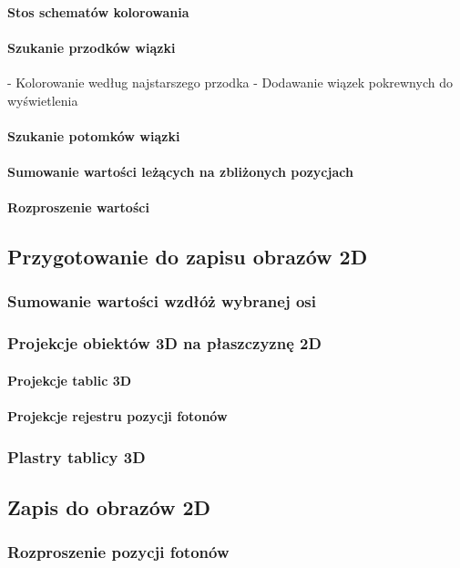 \paragraph{Stos schematów kolorowania}
\paragraph{Szukanie przodków wiązki}
- Kolorowanie według najstarszego przodka
- Dodawanie wiązek pokrewnych do wyświetlenia 
\paragraph{Szukanie potomków wiązki}
\paragraph{Sumowanie wartości leżących na zbliżonych pozycjach}
\paragraph{Rozproszenie wartości}

\subsection{Przygotowanie do zapisu obrazów 2D}
\subsubsection{Sumowanie wartości wzdłóż wybranej osi}
\subsubsection{Projekcje obiektów 3D na płaszczyznę 2D}
\paragraph{Projekcje tablic 3D}
\paragraph{Projekcje rejestru pozycji fotonów}
\subsubsection{Plastry tablicy 3D}
\subsection{Zapis do obrazów 2D}
\subsubsection{Rozproszenie pozycji fotonów}

